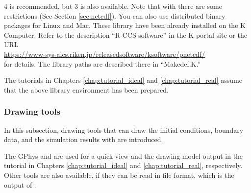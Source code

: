 {\netcdf}4 is recommended, but {\netcdf}3 is also available.
Note that with  there are some restrictions (See Section \ref{sec:netcdf}).
You can also use distributed binary packages for Linux and Mac.
These \netcdf library have been already installed on the K Computer. Refer to the description ``R-CCS software'' in the K portal site or the URL\\ \url{https://www-sys-aics.riken.jp/releasedsoftware/ksoftware/pnetcdf/}\\ for details. The library paths are described there in ``Makedef.K.''

The tutorials in Chapters \ref{chap:tutorial_ideal} and \ref{chap:tutorial_real} assume that the above library environment has been prepared.







\subsubsection{Drawing tools}

In this subsection, drawing tools that can draw the initial conditions, boundary data, and the simulation results with \scalerm are introduced.

The GPhys and \grads are used for a quick view
and the drawing model output in the tutorial in Chapters \ref{chap:tutorial_ideal} and \ref{chap:tutorial_real}, respectively.
Other tools are also available,
if they can be read in \netcdf file format, which is the output of \scalerm.

